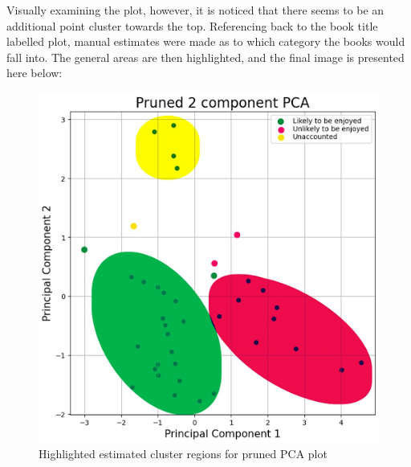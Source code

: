 \documentclass[12pt]{article}
\begin{document}
Visually examining the plot, however, it is noticed that there seems to be an additional point cluster towards the top. Referencing back to the book title labelled plot, manual estimates were made as to which category the books would fall into. The general areas are then highlighted, and the final image is presented here below:
\begin{figure}[H]
	\includegraphics[scale=0.4]{7}
	\centering
	\caption{Highlighted estimated cluster regions for pruned PCA plot}
\end{figure}
\end{document}
